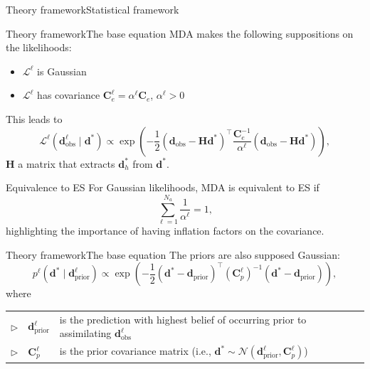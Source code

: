 \begin{frame}{Theory framework}{Statistical framework}
    \centering 
    
\end{frame}

\begin{frame}{Theory framework}{The base equation}
    MDA makes the following suppositions on the likelihoods:
    \begin{itemize}
        \item [$\triangleright$] $\mathcal{L}^\ell$ is Gaussian
        \item [$\triangleright$] $\mathcal{L}^\ell$ has covariance 
            $\mathbf{C}^\ell_e = \alpha^\ell \mathbf{C}_e$, $\alpha^\ell > 0$
    \end{itemize}
    This leads to 
    \begin{equation}
        \mathcal{L}^\ell(\mathbf{d}^\ell_\text{obs} \mid \mathbf{d}^*)
        \propto 
        \exp\left(-
            \frac{1}{2} 
            (\mathbf{d}_\text{obs} - \mathbf{H}\mathbf{d}^*)^\top 
            \frac{\mathbf{C}_e^{-1}}{\alpha^\ell}
            (\mathbf{d}_\text{obs} - \mathbf{H}\mathbf{d}^*)
        \right),
    \end{equation}
    $\mathbf{H}$ a matrix that extracts $\mathbf{d}^*_h$ from $\mathbf{d}^*$.
    \vfill
    \begin{block}{Equivalence to ES}
        For Gaussian likelihoods, MDA is equivalent to ES if 
        \begin{equation}
            \sum_{\ell=1}^{N_a} \frac{1}{\alpha^\ell} = 1,
        \end{equation}
        highlighting the importance of having inflation factors on the covariance.
    \end{block}
\end{frame}

\begin{frame}{Theory framework}{The base equation}
    The priors are also supposed Gaussian:
    \begin{equation}
        p^\ell(\mathbf{d}^* \mid \mathbf{d}^\ell_\text{prior}) \propto \exp\left(-
            \frac{1}{2}
            (\mathbf{d}^* - \mathbf{d}_\text{prior})^\top 
            (\mathbf{C}^\ell_p)^{-1}
            (\mathbf{d}^* - \mathbf{d}_\text{prior})
        \right),
    \end{equation}
    where 
    
    \medskip

    \def\arraystretch{1.5}
    \begin{tabular}{lll}
        $\triangleright$ & $\mathbf{d}^\ell_\text{prior}$ 
            & is the prediction with highest belief of occurring prior to assimilating $\mathbf{d}^\ell_\text{obs}$\\
        $\triangleright$ & $\mathbf{C}^\ell_p$ & is the prior covariance matrix (i.e., $\mathbf{d}^* \sim \mathcal{N}(\mathbf{d}^\ell_\text{prior}, \mathbf{C}^\ell_p)$)\\ 
    \end{tabular}
\end{frame}

